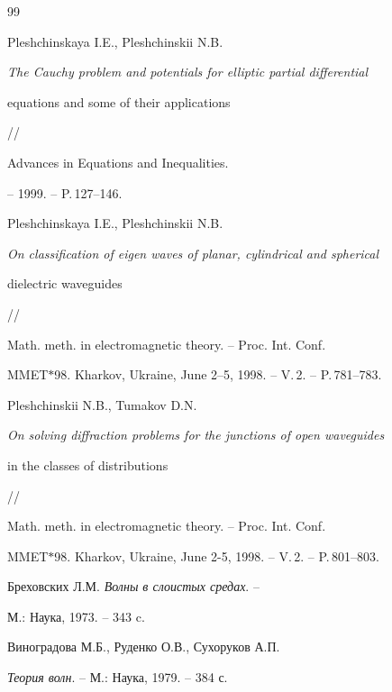 \begin{thebibliography}{99}







Pleshchinskaya I.E., Pleshchinskii N.B.


{\em The Cauchy problem and potentials for elliptic partial differential


equations and some of their applications} //


Advances in Equations and Inequalities. 




-- 1999. -- P.\,127--146.







Pleshchinskaya I.E., Pleshchinskii N.B.


{\em On classification of eigen waves of planar, cylindrical and spherical


dielectric waveguides} //


Math. meth. in electromagnetic theory. -- Proc. Int. Conf.


MMET$\ast$98. Kharkov, Ukraine, June 2--5, 1998. -- V.\,2. -- P.\,781--783.







Pleshchinskii N.B., Tumakov D.N.


{\em On solving diffraction problems for the junctions of open waveguides


in the classes of distributions} //


Math. meth. in electromagnetic theory. -- Proc. Int. Conf.


MMET$\ast$98. Kharkov, Ukraine, June 2-5, 1998. -- V.\,2. -- P.\,801--803.







Бреховских Л.М. {\em Волны в слоистых средах}. --


М.: Наука, 1973. -- 343 c.







Виноградова М.Б., Руденко О.В., Сухоруков А.П.


{\em Теория волн}. -- М.: Наука, 1979. -- 384 с.






\end{thebibliography}
